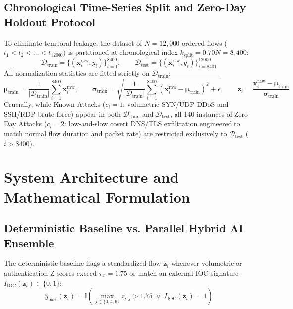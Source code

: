 \documentclass[10pt,a4paper]{article}
\begin{document}
\subsection{Chronological Time-Series Split and Zero-Day Holdout Protocol}
To eliminate temporal leakage, the dataset of $N = 12,000$ ordered flows ($t_1 < t_2 < \dots < t_{12000}$) is partitioned at chronological index $k_{\text{split}} = 0.70 N = 8,400$:
\begin{equation}
\mathcal{D}_{\text{train}} = \{(\mathbf{x}_i^{\text{raw}}, y_i)\}_{i=1}^{8400}, \qquad \mathcal{D}_{\text{test}} = \{(\mathbf{x}_i^{\text{raw}}, y_i)\}_{i=8401}^{12000}
\end{equation}
All normalization statistics are fitted strictly on $\mathcal{D}_{\text{train}}$:
\begin{equation}
\boldsymbol{\mu}_{\text{train}} = \frac{1}{|\mathcal{D}_{\text{train}}|} \sum_{i=1}^{8400} \mathbf{x}_i^{\text{raw}}, \qquad \boldsymbol{\sigma}_{\text{train}} = \sqrt{\frac{1}{|\mathcal{D}_{\text{train}}|} \sum_{i=1}^{8400} (\mathbf{x}_i^{\text{raw}} - \boldsymbol{\mu}_{\text{train}})^2 + \epsilon}, \qquad \mathbf{z}_i = \frac{\mathbf{x}_i^{\text{raw}} - \boldsymbol{\mu}_{\text{train}}}{\boldsymbol{\sigma}_{\text{train}}}
\end{equation}
Crucially, while Known Attacks ($c_i = 1$: volumetric SYN/UDP DDoS and SSH/RDP brute-force) appear in both $\mathcal{D}_{\text{train}}$ and $\mathcal{D}_{\text{test}}$, all 140 instances of Zero-Day Attacks ($c_i = 2$: low-and-slow covert DNS/TLS exfiltration engineered to match normal flow duration and packet rate) are restricted exclusively to $\mathcal{D}_{\text{test}}$ ($i > 8400$).

\section{System Architecture and Mathematical Formulation}
\subsection{Deterministic Baseline vs. Parallel Hybrid AI Ensemble}
The deterministic baseline flags a standardized flow $\mathbf{z}_i$ whenever volumetric or authentication Z-scores exceed $\tau_Z = 1.75$ or match an external IOC signature $I_{\text{IOC}}(\mathbf{z}_i) \in \{0, 1\}$:
\begin{equation}
\hat{y}_{\text{base}}(\mathbf{z}_i) = \mathbb{I}\!\left( \max_{j \in \{0, 4, 6\}} z_{i,j} > 1.75 \;\lor\; I_{\text{IOC}}(\mathbf{z}_i) = 1 \right)
\end{equation}
\end{document}
